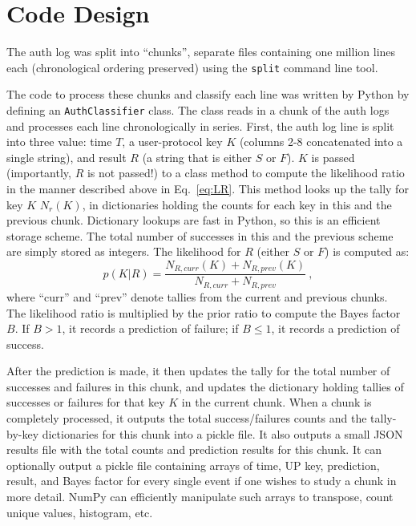 \documentclass[aps, prd, amsmath, floats, floatfix, superscriptaddress,
nofootinbib,eqsecnum]{revtex4}
\begin{document}
\section{Code Design}
\label{sec:Code}

The auth log was split into ``chunks'', separate files containing
one million lines each (chronological ordering preserved) using the {\tt split} command line tool. 

The code to process these chunks and classify each line was written by Python by defining an {\tt AuthClassifier} class.
The class reads in a chunk of the auth logs and processes each line chronologically in series.
First, the auth log line is split into three value: time $T$, a user-protocol key $K$
(columns 2-8 concatenated into a single string), and result $R$ (a string that is either $S$ or $F$).
$K$ is passed (importantly, $R$ is not passed!) to a class method to compute the likelihood ratio
in the manner described above in Eq.~\ref{eq:LR}.
This method looks up the tally for key $K$ $N_r(K)$, in dictionaries holding the counts for each key
in this and the previous chunk. Dictionary lookups are fast in Python, so this is an efficient storage scheme.
The total number of successes in this and the previous scheme are simply stored as integers. The likelihood for $R$
(either $S$ or $F$) is computed as:
\begin{equation}
p(K|R) = \frac{N_{R,curr}(K) + N_{R,prev}(K)}{N_{R,curr} + N_{R,prev}}\ ,
\end{equation}
where ``curr'' and ``prev'' denote tallies from the current and previous chunks.  
The likelihood ratio is multiplied by the prior ratio to compute the Bayes factor $B$. If $B > 1$,
it records a prediction of failure;
if $B \leq 1$, it records a prediction of success.

After the prediction is made, it then updates the tally for the total number of successes and failures in this chunk,
and updates the dictionary holding tallies of successes or failures for that key $K$ in the current chunk. 
When a chunk is completely processed, it outputs the total success/failures counts and the tally-by-key dictionaries for this
chunk into a pickle file. It also outputs a small JSON results file with the total counts and prediction results for this chunk.
It can optionally output a pickle file containing arrays of time, UP key, prediction, result, and Bayes factor for every single
event if one wishes to study a chunk in more detail.
NumPy can efficiently manipulate such arrays to transpose, count unique values, histogram, etc.
\end{document}
